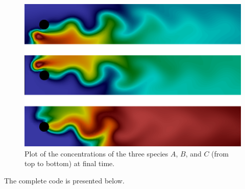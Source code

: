 \documentclass[graybox,envcountchap,sectrefs,final]{svmonodo}
\begin{document}
\begin{figure}[!ht]  %
  \centerline{\includegraphics[width=0.95\linewidth]{fig/reaction_system.png}}
  \caption{
  Plot of the concentrations of the three species $A$, $B$, and $C$ (from top to bottom) at final time. \label{ftut1:fig:reactionsystem:solution}
  }
\end{figure}

The complete code is presented below.
\end{document}
